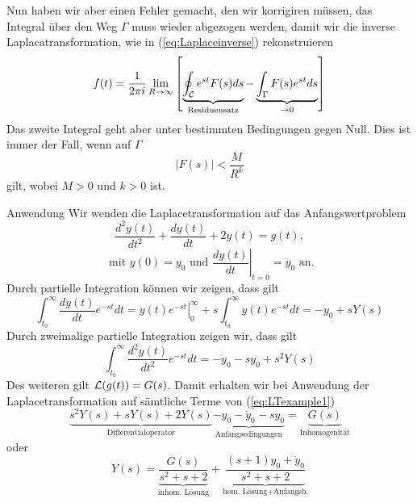 Nun haben wir aber einen Fehler gemacht, den wir korrigiren müssen, das Integral
über den Weg $\Gamma$ muss wieder abgezogen werden, damit wir die inverse
Laplacatransformation, wie in (\ref{eq:Laplaceinverse}) rekonstruieren
\begin{equation}\label{eq:Laplaceinverse2}
f(t)=\frac{1}{2\pi i}\lim_{R\rightarrow\infty}\left[
\underbrace{\oint_{\cal C}e^{st}F(s)ds}_{\text{Residuensatz}}
-\underbrace{\int_{\Gamma} F(s) e^{st}ds}_{\rightarrow 0}\right]
\end{equation}
Das zweite Integral geht aber unter bestimmten Bedingungen gegen Null. 
Dies ist immer der Fall, wenn auf $\Gamma$
\[|F(s)|<\frac{M}{R^k}\]
gilt, wobei $M>0$ und $k>0$ ist.

\begin{example}{Anwendung}
Wir wenden die Laplacetransformation auf das Anfangswertproblem
\begin{equation}
  \frac{d^2y(t)}{dt^2}+ \frac{dy(t)}{dt}+2y(t)=g(t), 
  \label{eq:LTexample1}
\end{equation}
\[\mbox{ mit } y(0)=y_0\mbox{ und } \left.\frac{dy(t)}{dt}\right|_{t=0}=\dot{y}_0\mbox{ an.}\]
Durch partielle Integration können wir zeigen, dass gilt
\[\int_{t_0}^\infty\frac{dy(t)}{dt}e^{-st}dt=
\left.y(t)e^{-st}\right|_0^\infty+s\int_{t_0}^\infty y(t)e^{-st}dt=-y_0+sY(s)\]
Durch zweimalige partielle Integration zeigen wir, dass gilt
\[\int_{t_0}^\infty\frac{d^2y(t)}{dt^2}e^{-st}dt=-\dot{y}_0-sy_0+s^2Y(s)\]
Des weiteren gilt ${\cal L}(g(t))=G(s)$. Damit erhalten wir bei Anwendung der
Laplacetransformation auf sämtliche Terme von (\ref{eq:LTexample1})
\[
\underbrace{s^2Y(s)+sY(s)+2Y(s)}_{\text{Differentialoperator}}
\underbrace{-y_0-\dot{y}_0-sy_0}_{\text{Anfangsedingungen}}=
\underbrace{G(s)}_{\text{Inhomogenität}}
\]  
oder
\begin{equation}
  Y(s)=\underbrace{\frac{G(s)}{s^2+s+2}}_{\mbox{inhom. Lösung}}
  +\underbrace{\frac{(s+1)y_0+\dot{y}_0}{s^2+s+2}}_{\mbox{hom. Lösung+Anfangsb.}}
\end{equation}
\end{example}
\newpage
